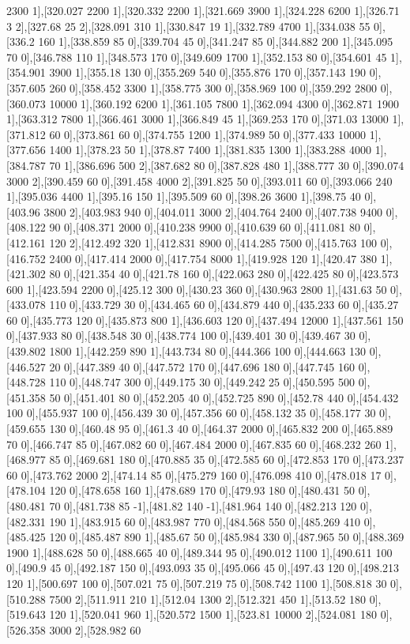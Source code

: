 {2300 1],[320.027 2200 1],[320.332 2200 1],[321.669 3900 1],[324.228 6200 1],[326.71 3 2],[327.68 25 2],[328.091 310 1],[330.847 19 1],[332.789 4700 1],[334.038 55 0],[336.2 160 1],[338.859 85 0],[339.704 45 0],[341.247 85 0],[344.882 200 1],[345.095 70 0],[346.788 110 1],[348.573 170 0],[349.609 1700 1],[352.153 80 0],[354.601 45 1],[354.901 3900 1],[355.18 130 0],[355.269 540 0],[355.876 170 0],[357.143 190 0],[357.605 260 0],[358.452 3300 1],[358.775 300 0],[358.969 100 0],[359.292 2800 0],[360.073 10000 1],[360.192 6200 1],[361.105 7800 1],[362.094 4300 0],[362.871 1900 1],[363.312 7800 1],[366.461 3000 1],[366.849 45 1],[369.253 170 0],[371.03 13000 1],[371.812 60 0],[373.861 60 0],[374.755 1200 1],[374.989 50 0],[377.433 10000 1],[377.656 1400 1],[378.23 50 1],[378.87 7400 1],[381.835 1300 1],[383.288 4000 1],[384.787 70 1],[386.696 500 2],[387.682 80 0],[387.828 480 1],[388.777 30 0],[390.074 3000 2],[390.459 60 0],[391.458 4000 2],[391.825 50 0],[393.011 60 0],[393.066 240 1],[395.036 4400 1],[395.16 150 1],[395.509 60 0],[398.26 3600 1],[398.75 40 0],[403.96 3800 2],[403.983 940 0],[404.011 3000 2],[404.764 2400 0],[407.738 9400 0],[408.122 90 0],[408.371 2000 0],[410.238 9900 0],[410.639 60 0],[411.081 80 0],[412.161 120 2],[412.492 320 1],[412.831 8900 0],[414.285 7500 0],[415.763 100 0],[416.752 2400 0],[417.414 2000 0],[417.754 8000 1],[419.928 120 1],[420.47 380 1],[421.302 80 0],[421.354 40 0],[421.78 160 0],[422.063 280 0],[422.425 80 0],[423.573 600 1],[423.594 2200 0],[425.12 300 0],[430.23 360 0],[430.963 2800 1],[431.63 50 0],[433.078 110 0],[433.729 30 0],[434.465 60 0],[434.879 440 0],[435.233 60 0],[435.27 60 0],[435.773 120 0],[435.873 800 1],[436.603 120 0],[437.494 12000 1],[437.561 150 0],[437.933 80 0],[438.548 30 0],[438.774 100 0],[439.401 30 0],[439.467 30 0],[439.802 1800 1],[442.259 890 1],[443.734 80 0],[444.366 100 0],[444.663 130 0],[446.527 20 0],[447.389 40 0],[447.572 170 0],[447.696 180 0],[447.745 160 0],[448.728 110 0],[448.747 300 0],[449.175 30 0],[449.242 25 0],[450.595 500 0],[451.358 50 0],[451.401 80 0],[452.205 40 0],[452.725 890 0],[452.78 440 0],[454.432 100 0],[455.937 100 0],[456.439 30 0],[457.356 60 0],[458.132 35 0],[458.177 30 0],[459.655 130 0],[460.48 95 0],[461.3 40 0],[464.37 2000 0],[465.832 200 0],[465.889 70 0],[466.747 85 0],[467.082 60 0],[467.484 2000 0],[467.835 60 0],[468.232 260 1],[468.977 85 0],[469.681 180 0],[470.885 35 0],[472.585 60 0],[472.853 170 0],[473.237 60 0],[473.762 2000 2],[474.14 85 0],[475.279 160 0],[476.098 410 0],[478.018 17 0],[478.104 120 0],[478.658 160 1],[478.689 170 0],[479.93 180 0],[480.431 50 0],[480.481 70 0],[481.738 85 -1],[481.82 140 -1],[481.964 140 0],[482.213 120 0],[482.331 190 1],[483.915 60 0],[483.987 770 0],[484.568 550 0],[485.269 410 0],[485.425 120 0],[485.487 890 1],[485.67 50 0],[485.984 330 0],[487.965 50 0],[488.369 1900 1],[488.628 50 0],[488.665 40 0],[489.344 95 0],[490.012 1100 1],[490.611 100 0],[490.9 45 0],[492.187 150 0],[493.093 35 0],[495.066 45 0],[497.43 120 0],[498.213 120 1],[500.697 100 0],[507.021 75 0],[507.219 75 0],[508.742 1100 1],[508.818 30 0],[510.288 7500 2],[511.911 210 1],[512.04 1300 2],[512.321 450 1],[513.52 180 0],[519.643 120 1],[520.041 960 1],[520.572 1500 1],[523.81 10000 2],[524.081 180 0],[526.358 3000 2],[528.982 60 }
